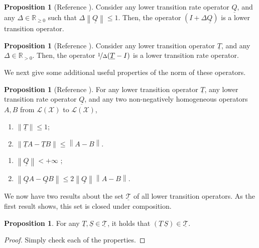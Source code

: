 \documentclass[10pt,a4paper]{paper}
\theoremstyle{definition}
\newtheorem{proposition}[theorem]{Proposition}
\newcommand{\reals}{\mathbb{R}}
\newcommand{\realspos}{\reals_{>0}}
\newcommand{\realsnonneg}{\reals_{\geq 0}}
\newcommand{\states}{\mathcal{X}}
\newcommand{\lt}{\underline{T}}
\newcommand{\gambles}{\mathcal{L}}
\newcommand{\gamblesX}{\gambles(\states)}
\newcommand{\lrate}{\underline{Q}}
\newcommand{\norm}[1]{\left\lVert #1 \right\rVert}
\begin{document}

\begin{proposition}[Reference \cite{DeBock:2016}]\label{lemma:normQsmallenough}
Consider any lower transition rate operator $\lrate$, and any $\Delta\in\realsnonneg$ such that $\Delta\norm{\lrate}\leq 1$. Then, the operator $(I+\Delta\lrate)$ is a lower transition operator.
\end{proposition}

\begin{proposition}[Reference \cite{DeBock:2016}]\label{lemma:lower_trans_to_lower_rate}
Consider any lower transition operator $\lt$, and any $\Delta\in\realspos$. Then, the operator $\nicefrac{1}{\Delta}(\lt - I)$ is a lower transition rate operator.
\end{proposition}

\noindent We next give some additional useful properties of the norm of these operators.

\begin{proposition}[Reference \cite{DeBock:2016}]\label{prop:norm_properties_lrate_lt}
For any lower transition operator $\lt$, any lower transition rate operator $\lrate$, and any two non-negatively homogeneous operators $A,B$ from $\gamblesX$ to $\gamblesX$,
\begin{multicols}{2}
\begin{enumerate}[label=LT\arabic*:,ref=LT\arabic*,start=4]
\item
$\norm{\lt} \leq 1$; \label{LT:norm_at_most_one}
\item
$\norm{\lt A - \lt B} \leq \norm{A - B}$. \label{LT:differencenorm}
\end{enumerate}
\begin{enumerate}[label=LR\arabic*:,ref=LR\arabic*,start=5]
\item
$\norm{\lrate} < +\infty$ \label{LR:normlratefinite};
\item
$\norm{\lrate A - \lrate B} \leq 2\norm{\lrate}\norm{A - B}.$ \label{LR:differenceofnorm}
\end{enumerate}
\end{multicols}
\end{proposition}

We now have two results about the set $\underline{\mathcal{T}}$ of all lower transition operators. As the first result shows, this set is closed under composition.
\begin{proposition}\label{lemma:compositioncoherence}
For any $\lt,\underline{S}\in\underline{\mathcal{T}}$, it holds that $\left(\lt\,\underline{S}\right)\in\underline{\mathcal{T}}$.
\end{proposition}
\begin{proof}
Simply check each of the properties.
\end{proof}
\end{document}
